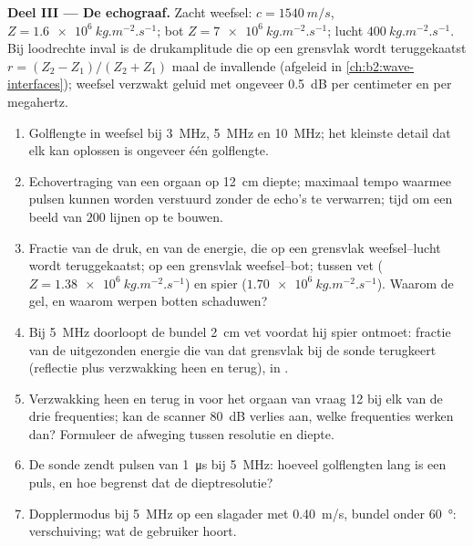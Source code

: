 \begin{problem}
\medskip
\noindent\textbf{Deel III --- De echograaf.}
Zacht weefsel: $c = \qty{1540}{m/s}$, $Z = \qty{1.6e6}{kg.m^{-2}.s^{-1}}$;
bot $Z = \qty{7e6}{kg.m^{-2}.s^{-1}}$; lucht $\qty{400}{kg.m^{-2}.s^{-1}}$.
Bij loodrechte inval is de drukamplitude die op een grensvlak wordt
teruggekaatst $r = (Z_2 -
Z_1)/(Z_2 + Z_1)$ maal de invallende (afgeleid in
\cref{ch:b2:wave-interfaces}); weefsel verzwakt geluid met ongeveer
\qty{0.5}{dB} per centimeter en per megahertz.
\begin{enumerate}[resume]
  \item Golflengte in weefsel bij \qty{3}{MHz}, \qty{5}{MHz} en
        \qty{10}{MHz}; het kleinste detail dat elk kan oplossen is ongeveer
        één golflengte.
  \item Echovertraging van een orgaan op \qty{12}{cm} diepte; maximaal tempo
        waarmee pulsen kunnen worden verstuurd zonder de echo's te
        verwarren; tijd om een beeld van $200$ lijnen op te bouwen.
  \item Fractie van de druk, en van de energie, die op een grensvlak
        weefsel--lucht wordt teruggekaatst; op een grensvlak weefsel--bot;
        tussen vet ($Z = \qty{1.38e6}{kg.m^{-2}.s^{-1}}$) en spier
        ($\qty{1.70e6}{kg.m^{-2}.s^{-1}}$). Waarom de gel, en waarom werpen
        botten schaduwen?
  \item Bij \qty{5}{MHz} doorloopt de bundel \qty{2}{cm} vet voordat hij
        spier ontmoet: fractie van de uitgezonden energie die van dat
        grensvlak bij de sonde terugkeert (reflectie plus verzwakking heen
        en terug), in .
  \item Verzwakking heen en terug in  voor het orgaan van vraag 12
        bij elk van de drie frequenties; kan de scanner \qty{80}{dB} verlies
        aan, welke frequenties werken dan? Formuleer de afweging tussen
        resolutie en diepte.
  \item De sonde zendt pulsen van \qty{1}{\micro s} bij \qty{5}{MHz}:
        hoeveel golflengten lang is een puls, en hoe begrenst dat de
        dieptresolutie?
  \item Dopplermodus bij \qty{5}{MHz} op een slagader met \qty{0.40}{m/s},
        bundel onder \qty{60}{\degree}: verschuiving; wat de gebruiker
        hoort.
\end{enumerate}


\end{problem}
